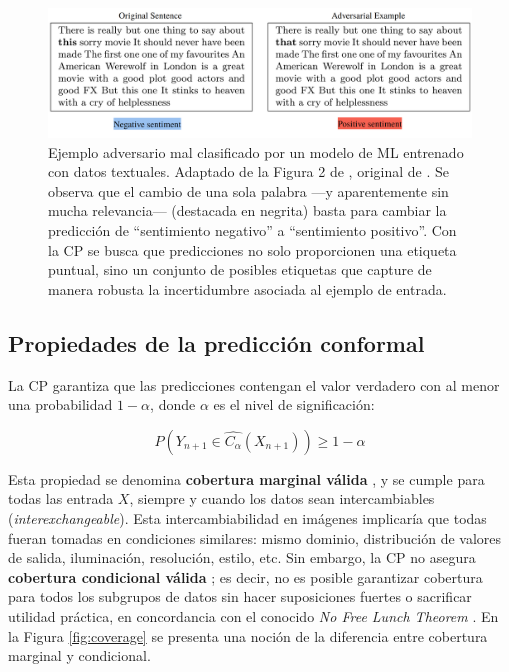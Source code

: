 \begin{figure}[h]
    \centering
    \includegraphics[width=\textwidth]{capitulos/cap_02/imagenes/adversarial_example.png}
    \caption[
        Ejemplo adversario mal clasificado por un modelo de ML entrenado con datos textuales.
        Adaptado de la Figura 2 de \cite{hullermeier2021}, original de \cite{sato2018}.
    ]{
        Ejemplo adversario mal clasificado por un modelo de ML entrenado con datos textuales.
        Adaptado de la Figura 2 de \cite{hullermeier2021}, original de \cite{sato2018}.
        Se observa que el cambio de una sola palabra ---y aparentemente sin mucha relevancia--- (destacada en 
        negrita) basta para cambiar la predicción de ``sentimiento negativo'' a ``sentimiento positivo''.
        Con la CP se busca que predicciones no solo proporcionen una etiqueta puntual, sino un conjunto de 
        posibles etiquetas que capture de manera robusta la incertidumbre asociada al ejemplo de entrada.
    } 
    \label{fig:adversarial_example}
\end{figure}


\subsection{Propiedades de la predicción conformal}

La CP garantiza que las predicciones contengan el valor verdadero con al menor una probabilidad $1-\alpha$, 
donde $\alpha$ es el nivel de significación:

$$
P(Y_{n+1} \in \hat{C_\alpha}(X_{n+1})) \ge 1 - \alpha
$$

Esta propiedad se denomina \textbf{cobertura marginal válida} \cite{prinster2024}, y se cumple para todas las 
entrada $X$, siempre y cuando los datos sean intercambiables (\textit{interexchangeable}). 
Esta intercambiabilidad en imágenes implicaría que todas fueran tomadas en condiciones similares: mismo 
dominio, distribución de valores de salida, iluminación, resolución, estilo, etc.
Sin embargo, la CP no asegura \textbf{cobertura condicional válida} \cite{foygel2021}; es decir, no es posible 
garantizar cobertura para todos los subgrupos de datos sin hacer suposiciones fuertes o sacrificar utilidad 
práctica, en concordancia con el conocido \textit{No Free Lunch Theorem} \cite{wolpert1997}. En la Figura
\ref{fig:coverage} se presenta una noción de la diferencia entre cobertura marginal y condicional. 

